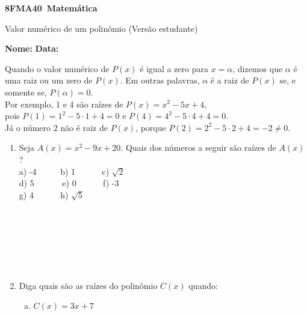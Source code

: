 \documentclass[a4paper,14pt]{article}
\begin{document}
	
	\noindent\textbf{8FMA40~Matemática} 
	
	\begin{center}Valor numérico de um polinômio (Versão estudante)
	\end{center}
	
	\noindent\textbf{Nome:} \underline{\hspace{10cm}}
	\noindent\textbf{Data:} \underline{\hspace{4cm}}
	
	
    \begin{multicols}{2}
    	Quando o valor numérico de $P(x)$ é igual a zero para $x = \alpha$, dizemos que $\alpha$ é uma raiz ou um zero de $P(x)$. Em outras palavras, $\alpha$ é a raiz de $P(x)$ se, e somente se, $P(\alpha) = 0$.\\
    	Por exemplo, 1 e 4 são raízes de $P(x) = x^2 - 5x + 4$, \\ pois $P(1) = 1^2 - 5 \cdot 1 + 4 = 0$ e $P(4) = 4^2 - 5 \cdot 4 + 4 = 0$. \\
    	Já o número 2 não é raiz de $P(x)$, porque $P(2) = 2^2 - 5 \cdot 2 + 4 = -2 \neq 0$.
    	\begin{enumerate}
    		\item Seja $A(x) = x^2 - 9x + 20$. Quais dos números a seguir são raízes de $A(x)$?\\
    		a) -4~~~~~ b) 1 ~~~~~ c) $\sqrt{2}$ \\
    		d) 5~~~~~~ e) 0 ~~~~~ f) -3 \\
    		g) 4 ~~~~~ h) $\sqrt{5}$\\\\\\\\\\\\\\
    		\item Diga quais são as raízes do polinômio $C(x)$ quando:
    		\begin{enumerate}[a)]
    			\item $C(x) = 3x + 7$ \\\\\\\\\\\\\\

\end{enumerate}
\end{enumerate}
\end{multicols}
\end{document}
